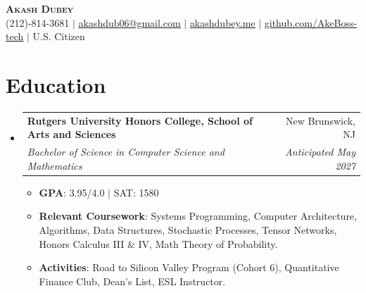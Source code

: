 \documentclass[letterpaper,11pt]{article}
\makeatletter
\newcommand{\resumeItem}[1]{
  \item\small{
    {#1 \vspace{-2pt}}
  }
}
\newcommand{\resumeSubheading}[4]{
  \vspace{-2pt}\item
    \begin{tabular*}{0.97\textwidth}[t]{l@{\extracolsep{\fill}}r}
      \textbf{#1} & #2 \\
      \textit{\small#3} & \textit{\small #4} \\
    \end{tabular*}\vspace{-7pt}
}
\newcommand{\resumeSubHeadingListStart}{\begin{itemize}[leftmargin=0.15in, label={}]}
\newcommand{\resumeSubHeadingListEnd}{\end{itemize}}
\newcommand{\resumeItemListStart}{\begin{itemize}}
\newcommand{\resumeItemListEnd}{\end{itemize}\vspace{-5pt}}
\makeatother
\begin{document}
\begin{center}
    \textbf{\Huge \scshape Akash Dubey} \\ \vspace{1pt}
    \small (212)-814-3681 $|$ \href{mailto:akashdub06@gmail.com}{\underline{akashdub06@gmail.com}} $|$
    \href{https://akashdubey.me/}{\underline{akashdubey.me}} $|$
    \href{https://github.com/AkeBoss-tech}{\underline{github.com/AkeBoss-tech}} $|$
    \small U.S. Citizen
\end{center}
\section{Education}
  \resumeSubHeadingListStart
    \resumeSubheading
      {Rutgers University Honors College, School of Arts and Sciences}{New Brunswick, NJ}
      {Bachelor of Science in Computer Science and Mathematics}{Anticipated May 2027}
      \resumeItemListStart
        \resumeItem{\textbf{GPA}: 3.95/4.0 $|$ SAT: 1580}
        \resumeItem{\textbf{Relevant Coursework}: Systems Programming, Computer Architecture, Algorithms, Data Structures, Stochastic Processes, Tensor Networks, Honors Calculus III \& IV, Math Theory of Probability.}
        \resumeItem{\textbf{Activities}: Road to Silicon Valley Program (Cohort 6), Quantitative Finance Club, Dean's List, ESL Instructor.}
      \resumeItemListEnd
  \resumeSubHeadingListEnd
\end{document}
